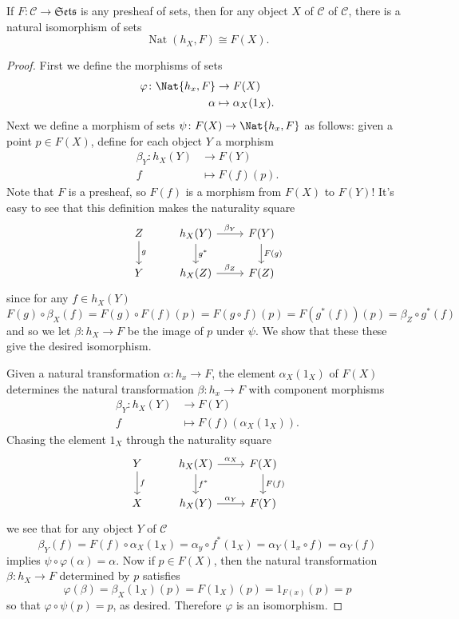 \documentclass[10pt]{amsart}
\begin{document}
\begin{lem}[Yoneda]
  If $F \colon \mathscr{C} \rightarrow \mathfrak{Sets}$ is any presheaf of sets, then for any object $X$ of $\mathscr{C}$ of $\mathscr{C}$, there is a natural isomorphism of sets
  $$\operatorname{Nat}(h_X, F) \cong F(X).$$

  \begin{proof}
    First we define the morphisms of sets
    \begin{align*}
      \varphi \colon \Nat{h_x, F} &\rightarrow F(X)\\
      \alpha &\mapsto \alpha_X(1_X).
    \end{align*}
    Next we define a morphism of sets $\psi \colon F(X) \rightarrow \Nat{h_x, F}$ as follows:
    given a point $p \in F(X)$, define for each object $Y$ a morphism
    \begin{align*}
      \beta_Y \colon h_X(Y) &\rightarrow F(Y)\\
      f &\mapsto F(f)(p).
    \end{align*}
    Note that $F$ is a presheaf, so $F(f)$ is a morphism from $F(X)$ to $F(Y)$!
    It's easy to see that this definition makes the naturality square
    $$\begin{tikzcd}
      Z\arrow{d}{g} & h_X(Y)\arrow{d}{g^*}\arrow{r}{\beta_Y} & F(Y)\arrow{d}{F(g)}\\
      Y & h_X(Z)\arrow{r}{\beta_Z} & F(Z)
    \end{tikzcd}$$
    since for any $f \in h_X(Y)$
    $$F(g) \circ \beta_X(f) = F(g) \circ F(f) (p) = F(g \circ f)(p) = F(g^*(f))(p) = \beta_Z \circ g^* (f)$$
    and so we let $\beta : h_X \rightarrow F$ be the image of $p$ under $\psi$.
    We show that these these give the desired isomorphism.

    Given a natural transformation $\alpha \colon h_x \rightarrow F$, the element $\alpha_X(1_X)$ of $F(X)$ determines the natural transformation $\beta : h_x \rightarrow F$ with component morphisms
    \begin{align*}
      \beta_Y \colon h_X(Y) &\rightarrow F(Y)\\
      f &\mapsto F(f)(\alpha_X(1_X)).
    \end{align*}
    Chasing the element $1_X$ through the naturality square
    $$\begin{tikzcd}
      Y\arrow{d}{f} & h_X(X)\arrow{d}{f^*}\arrow{r}{\alpha_X} & F(X)\arrow{d}{F(f)}\\
      X & h_X(Y)\arrow{r}{\alpha_Y} & F(Y)
    \end{tikzcd}$$
    we see that for any object $Y$ of $\mathscr{C}$
    $$\beta_Y(f) = F(f) \circ \alpha_X (1_X) = \alpha_y \circ f^*(1_X) = \alpha_Y(1_x \circ f) = \alpha_Y(f)$$
    implies $\psi \circ \varphi(\alpha) = \alpha$.
    Now if $p \in F(X)$, then the natural transformation $\beta : h_X \rightarrow F$ determined by $p$ satisfies
    $$\varphi(\beta) = \beta_X(1_X)(p) = F(1_X)(p) = 1_{F(x)}(p) = p$$
    so that $\varphi \circ \psi (p) = p$, as desired.
    Therefore $\varphi$ is an isomorphism.


\end{proof}
\end{lem}
\end{document}
